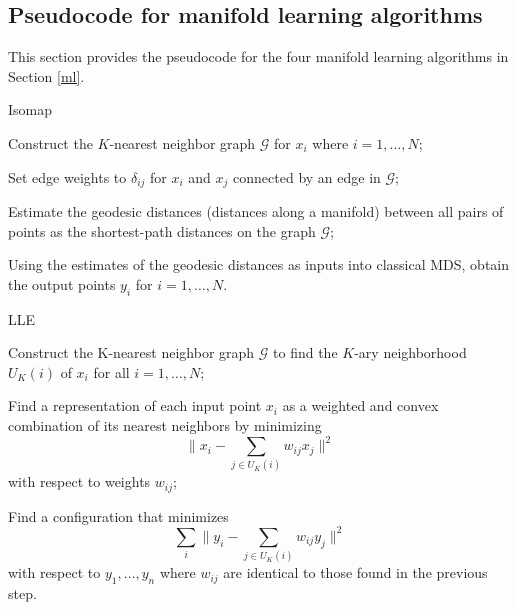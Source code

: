 \documentclass[11pt,a4paper,]{article}
\begin{document}
\subsection{Pseudocode for manifold learning algorithms}
\label{sec:mlalg}
This section provides the pseudocode for the four manifold learning algorithms in Section \ref{ml}.

\begin{algorithm}[!htb]
  \caption{Isomap}
  \label{alg:isomap}
  \DontPrintSemicolon
  \SetAlgoLined
  \BlankLine

  Construct the $K$-nearest neighbor graph $\mathcal{G}$ for $x_i$ where $i=1,\ldots,N$;

  Set edge weights to $\delta_{ij}$ for $x_i$ and $x_j$ connected by an edge in $\mathcal{G}$;

  Estimate the geodesic distances (distances along a manifold) between all pairs of points as the shortest-path distances on the graph $\mathcal{G}$;

  Using the estimates of the geodesic distances as inputs into classical MDS, obtain the output points $y_i$ for $i=1,\ldots,N$.

\end{algorithm}


\begin{algorithm}[!htb]
  \caption{LLE}
  \label{alg:lle}
  \DontPrintSemicolon
  \SetAlgoLined
  \BlankLine

  Construct the K-nearest neighbor graph $\mathcal{G}$ to find the $K$-ary neighborhood $U_K(i)$ of $x_i$ for all $i=1,\ldots,N$;

  Find a representation of each input point $x_i$ as a weighted and convex combination of its nearest neighbors by minimizing
  $$
    \bigg\|x_{i}-\sum_{j \in U_K(i)} w_{i j} x_{j}\bigg\|^{2}
  $$
  with respect to weights $w_{ij}$;

  Find a configuration that minimizes
  $$
    \sum_{i}\bigg\|y_{i}-\sum_{j \in U_K(i)} w_{i j} y_{j}\bigg\|^{2}
  $$
  with respect to $y_{1}, \dots, y_{n}$ where $w_{ij}$ are identical to those found in the previous step.

\end{algorithm}
\end{document}
